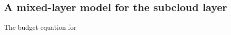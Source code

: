 \documentclass[12pt]{article}
\begin{document}
 \renewcommand{\theequation}{A-\arabic{equation}}
  \setcounter{equation}{0}  %
\begin{appendices}

\section{A mixed-layer model for the subcloud layer}

The budget equation for 
\end{appendices}

{}
{\clearpage}


\end{document}
